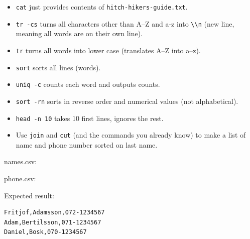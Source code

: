 \begin{frame}
  \begin{solution}
    \begin{itemize}
      \item \lstinline{cat} just provides contents of 
        \lstinline{hitch-hikers-guide.txt}.
      \item \lstinline{tr -cs} turns all characters other than A--Z and a-z 
        into \lstinline{\\n} (new line, meaning all words are on their own 
        line).
      \item \lstinline{tr} turns all words into lower case (translates A--Z 
        into a--z).
      \item \lstinline{sort} sorts all lines (words).
      \item \lstinline{uniq -c} counts each word and outputs counts.
      \item \lstinline{sort -rn} sorts in reverse order and numerical values 
        (not alphabetical).
      \item \lstinline{head -n 10} takes 10 first lines, ignores the rest.
    \end{itemize}
  \end{solution}
\end{frame}

\begin{frame}[fragile]
  \begin{exercise}
    \begin{itemize}
      \item Use \lstinline{join} and \lstinline{cut} (and the commands you 
        already know) to make a list of name and phone number sorted on last 
        name.
    \end{itemize}
    names.csv: 

    phone.csv: 

    \pause

    Expected result:
    \begin{lstlisting}[numbers=none]
Fritjof,Adamsson,072-1234567
Adam,Bertilsson,071-1234567
Daniel,Bosk,070-1234567
    \end{lstlisting}
  \end{exercise}
\end{frame}

\begin{frame}[fragile]
  \begin{solution}
    
  \end{solution}
\end{frame}



